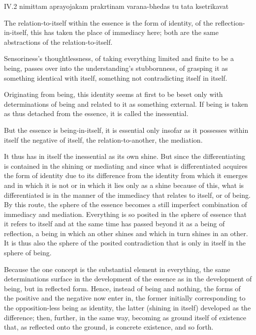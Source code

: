 IV.2
nimittam aprayojakam prakrtinam varana-bhedas tu tata ksetrikavat

The relation-to-itself within the essence is the form of identity,
of the reflection-in-itself, this has taken the place of immediacy here;
both are the same abstractions of the relation-to-itself.

    Sensoriness's thoughtlessness,
    of taking everything limited and finite to be a being,
    passes over into the understanding's stubbornness,
    of grasping it as something identical with itself,
    something not contradicting itself in itself.

Originating from being, this identity seems at first to be beset only with
determinations of being and related to it as something external.
If being is taken as thus detached from the essence,
it is called the inessential.

But the essence is being-in-itself, it is essential only insofar as
it possesses within itself the negative of itself,
the relation-to-another, the mediation.

It thus has in itself the inessential as its own shine.
But since the differentiating is contained in the shining or mediating
and since what is differentiated acquires the form of identity due to
its difference from the identity from which it emerges and in which it is not
or in which it lies only as a shine because of this,
what is differentiated is in the manner of
the immediacy that relates to itself, or of being.
By this route, the sphere of the essence becomes a
still imperfect combination of immediacy and mediation.
Everything is so posited in the sphere of essence
that it refers to itself and at the same time
has passed beyond it as a being of reflection,
a being in which an other shines and which in turn shines in an other.
It is thus also the sphere of the posited contradiction
that is only in itself in the sphere of being.

    Because the one concept is the substantial element in everything,
    the same determinations surface in the development of the essence
    as in the development of being, but in reflected form.
    Hence, instead of being and nothing,
    the forms of the positive and the negative now enter in,
    the former initially corresponding to
    the opposition-less being as identity,
    the latter (shining in itself) developed as the difference;
    then, further, in the same way,
    becoming as ground itself of existence that,
    as reflected onto the ground, is concrete existence, and so forth.

